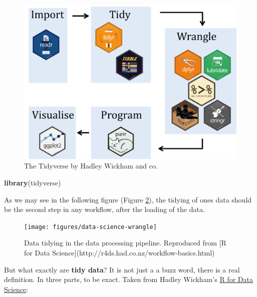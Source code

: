 \documentclass[
]{book}
\newenvironment{Shaded}{\begin{snugshade}}{\end{snugshade}}
\newcommand{\KeywordTok}[1]{\textcolor[rgb]{0.13,0.29,0.53}{\textbf{#1}}}
\newcommand{\NormalTok}[1]{#1}
\begin{document}
\begin{figure}

{\centering \includegraphics[width=1\linewidth]{figures/tidy_workflow} 

}

\caption{The Tidyverse by Hadley Wickham and co.}\label{fig:tidyverse}
\end{figure}

\begin{Shaded}
\begin{Highlighting}[]
\KeywordTok{library}\NormalTok{(tidyverse)}
\end{Highlighting}
\end{Shaded}

As we may see in the following figure (Figure \ref{fig:tidy}), the tidying of ones data should be the second step in any workflow, after the loading of the data.

\begin{figure}

{\centering \texttt{[image: figures/data-science-wrangle]} 

}

\caption{Data tidying in the data processing pipeline. Reproduced from [R for Data Science](http://r4ds.had.co.nz/workflow-basics.html)}\label{fig:tidy}
\end{figure}

But what exactly are \textbf{tidy data}? It is not just a a buzz word, there is a real definition. In three parts, to be exact. Taken from Hadley Wickham's \href{http://r4ds.had.co.nz/workflow-basics.html}{R for Data Science}:
\end{document}
